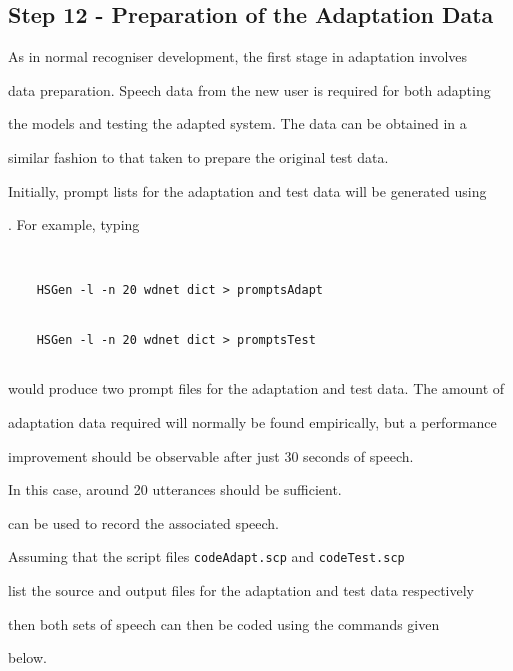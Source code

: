 \subsection{Step 12 - Preparation of the Adaptation Data}





As in normal recogniser development, the first stage in adaptation involves 


data preparation. Speech data from the new user is required for both adapting 


the models and testing the adapted system. The data can be obtained in a 


similar fashion to that taken to prepare the original test data.


Initially, prompt lists for the adaptation and test data will be generated using 


. For example, typing





\begin{verbatim}


    HSGen -l -n 20 wdnet dict > promptsAdapt


    HSGen -l -n 20 wdnet dict > promptsTest


\end{verbatim}





\noindent


would produce two prompt files for the adaptation and test data. The amount of 


adaptation data required will normally be found empirically, but a performance 


improvement should be observable after just 30 seconds of speech.


In this case, around 20 utterances should be sufficient.


 can be used to record the associated speech.





Assuming that the script files \texttt{codeAdapt.scp} and \texttt{codeTest.scp} 


list the source and output files for the adaptation and test data respectively 


then both sets of speech can then be coded using the  commands given 


below.





